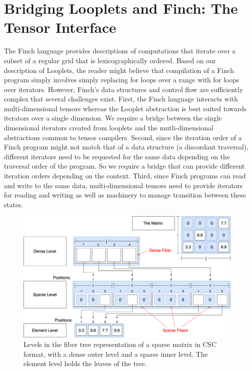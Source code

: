 \section{Bridging Looplets and Finch: The Tensor Interface}
%
The Finch language provides descriptions of computations that iterate over a subset of a regular grid that is lexicographically ordered.
%
Based on our description of Looplets, the reader might believe that compilation of a Finch program simply involves simply replacing for loops over a range with for loops over iterators.
%
However, Finch's data structures and control flow are sufficiently complex that several challenges exist.
%
First, the Finch language interacts with multi-dimensional tensors whereas the Looplet abstraction is best suited towards iterators over a single dimension.
%
We require a bridge between the single dimensional iterators created from looplets and the mutli-dimensional abstractions common to tensor compilers.
%
Second, since the iteration order of a Finch program might not match that of a data structure (a discordant traversal), different iterators need to be requested for the same data depending on the traversal order of the program.
%
So we require a bridge that can provide different iteration orders depending on the context.
%
Third, since Finch programs can read and write to the same data, multi-dimensional tensors need to provide iterators for reading and writing as well as machinery to manage transition between these states.

\begin{figure}
    \centering
    \includegraphics[width=\linewidth]{LevelsVsFibers-matrix.png}
    \caption{Levels in the fiber tree representation of a sparse matrix in CSC format, with a dense outer level and a sparse inner level. The element level holds the leaves of the tree.}
    \label{fig:levelsvsfibers}
\end{figure}

